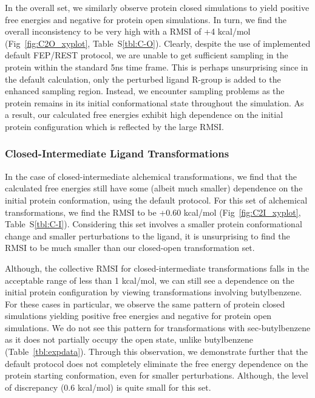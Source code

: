 \documentclass[journal=jctcce,manuscript=article]{achemso}
\begin{document}
In the overall set, we similarly observe protein closed simulations to yield positive free energies and negative for protein open simulations. 
In turn, we find the overall inconsistency to be very high with a RMSI of +4 kcal/mol (Fig~\ref{fig:C2O_xyplot}, Table~S\ref{tbl:C-O}). 
Clearly, despite the use of implemented default FEP/REST protocol, we are unable to get sufficient sampling in the protein within the standard 5ns time frame.
This is perhaps unsurprising since in the default calculation, only the perturbed ligand R-group is added to the enhanced sampling region.  
Instead, we encounter sampling problems as the protein remains in its initial conformational state throughout the simulation. 
As a result, our calculated free energies exhibit high dependence on the initial protein configuration which is reflected by the large RMSI.

\subsubsection*{Closed-Intermediate Ligand Transformations}
In the case of closed-intermediate alchemical transformations, we find that the calculated free energies still have some (albeit much smaller) dependence on the initial protein conformation, using the default protocol.
For this set of alchemical transformations, we find the RMSI to be +0.60 kcal/mol (Fig~\ref{fig:C2I_xyplot}, Table~S\ref{tbl:C-I}).
Considering this set involves a smaller protein conformational change and smaller perturbations to the ligand, it is unsurprising to find the RMSI to be much smaller than our closed-open transformation set.

Although, the collective RMSI for closed-intermediate transformations falls in the acceptable range of less than 1 kcal/mol, we can still see a dependence on the initial protein configuration by viewing transformations involving butylbenzene.
For these cases in particular, we observe the same pattern of protein closed simulations yielding positive free energies and negative for protein open simulations. 
We do not see this pattern for transformations with sec-butylbenzene as it does not partially occupy the open state, unlike butylbenzene (Table~\ref{tbl:expdata}).
Through this observation, we demonstrate further that the default protocol does not completely eliminate the free energy dependence on the protein starting conformation, even for smaller perturbations. 
Although, the level of discrepancy (0.6 kcal/mol) is quite small for this set.
\end{document}
